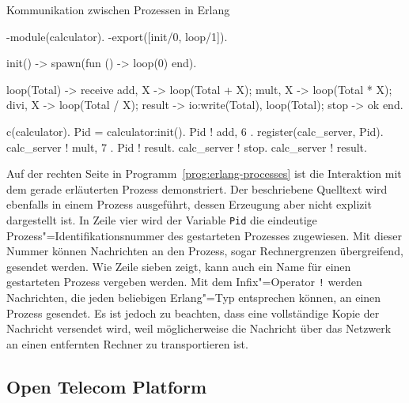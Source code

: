 \begin{program}[!hbt]
\caption{Kommunikation zwischen Prozessen in Erlang}
\label{prog:erlang-processes}
\noindent\begin{minipage}[t]{.52\textwidth}
\lstset{showlines=true}
\begin{ErlangCode}
-module(calculator).
-export([init/0, loop/1]).

init() ->
  spawn(fun () -> loop(0) end).

loop(Total) ->
  receive
    { add,  X } -> loop(Total + X);
    { mult, X } -> loop(Total * X);
		{ divi, X } -> loop(Total / X);
    result      -> io:write(Total),
									 loop(Total);
    stop    		-> ok
  end.
\end{ErlangCode}

\end{minipage}\hfill
\begin{minipage}[t]{.44\textwidth}
\lstset{showlines=true}
\begin{ErlangCode}
c(calculator).
Pid = calculator:init().
Pid ! { add, 6 }.
register(calc_server, Pid).
calc_server ! { mult, 7 }.
Pid ! result. %
calc_server ! stop.
calc_server ! result.
\end{ErlangCode}

\end{minipage}
\end{program}

Auf der rechten Seite in Programm~\ref{prog:erlang-processes} ist die Interaktion mit dem gerade erläuterten Prozess demonstriert. Der beschriebene Quelltext wird ebenfalls in einem Prozess ausgeführt, dessen Erzeugung aber nicht explizit dargestellt ist. In Zeile vier wird der Variable \lstinline{Pid} die eindeutige Prozess"=Identifikationsnummer des gestarteten Prozesses zugewiesen. Mit dieser Nummer können Nachrichten an den Prozess, sogar Rechnergrenzen übergreifend, gesendet werden. Wie Zeile sieben zeigt, kann auch ein Name für einen gestarteten Prozess vergeben werden. Mit dem Infix"=Operator \lstinline{!} werden Nachrichten, die jeden beliebigen Erlang"=Typ entsprechen können, an einen Prozess gesendet. Es ist jedoch zu beachten, dass eine vollständige Kopie der Nachricht versendet wird, weil möglicherweise die Nachricht  über das Netzwerk an einen entfernten Rechner zu transportieren ist.

\subsection{Open Telecom Platform}

